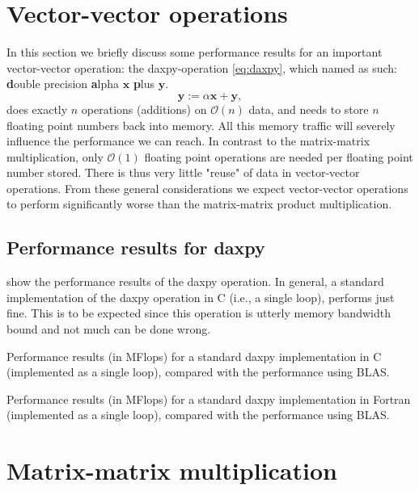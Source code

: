 \section{Vector-vector operations}

In this section we briefly discuss some performance results for an important
vector-vector operation: the daxpy-operation \eqref{eq:daxpy}, which named as
such: \textbf{d}ouble precision \textbf{a}lpha $\bm x$ \textbf{p}lus $\bm y$.
\[
  \bm y := \alpha \bm x + \bm y,
\]
does exactly $n$ operations (additions) on $\mathcal{O}(n)$ data, and needs to
store $n$ floating point numbers back into memory. All this memory traffic will
severely influence the performance we can reach. In contrast to the
matrix-matrix multiplication, only $\mathcal{O}(1)$ floating point operations
are needed per floating point number stored. There is thus very little "reuse"
of data in vector-vector operations. From these general considerations we expect
vector-vector operations to perform significantly worse than the matrix-matrix
product multiplication.

\subsection{Performance results for daxpy}

 show the performance results of the daxpy
operation. In general, a standard implementation of the daxpy operation in C
(i.e., a single loop), performs just fine. This is to be expected since this
operation is utterly memory bandwidth bound and not much can be done wrong.

\begin{table}
  \caption{
    Performance results (in MFlops) for a standard daxpy implementation in C
    (implemented as a single loop), compared with the performance using BLAS.
  }
  \label{tab:tab9}
  
\end{table}

\begin{table}
  \caption{
    Performance results (in MFlops) for a standard daxpy implementation in
    Fortran (implemented as a single loop), compared with the performance using
    BLAS.
  }
  \label{tab:tab10}
  
\end{table}

\section{Matrix-matrix multiplication}


